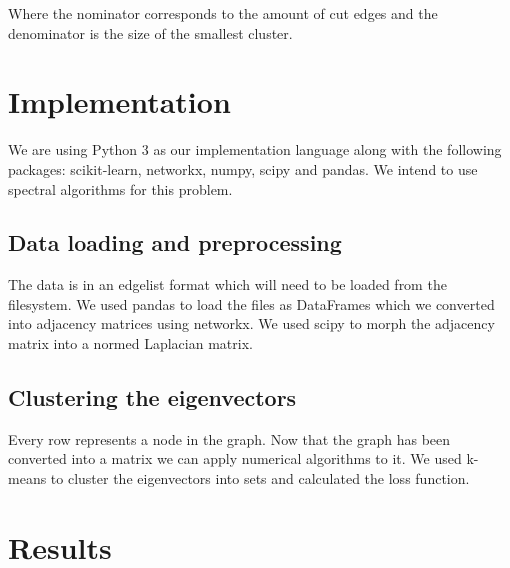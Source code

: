 \documentclass{article}
\begin{document}
Where the nominator corresponds to the amount of cut edges and the denominator is the size of the smallest cluster. 

\section{Implementation} %

We are using Python 3 as our implementation language along with the following packages: scikit-learn, networkx, numpy, scipy and pandas. We intend to use spectral algorithms for this problem.

\subsection{Data loading and preprocessing}

The data is in an edgelist format which will need to be loaded from the filesystem. We used pandas to load the files as DataFrames which we converted into adjacency matrices using networkx. We used scipy to morph the adjacency matrix into a normed Laplacian matrix.
	

\subsection{Clustering the eigenvectors}

Every row represents a node in the graph. Now that the graph has been converted into a matrix we can apply numerical algorithms to it. We used k-means to cluster the eigenvectors into sets and calculated the loss function.

\section{Results}
\end{document}
